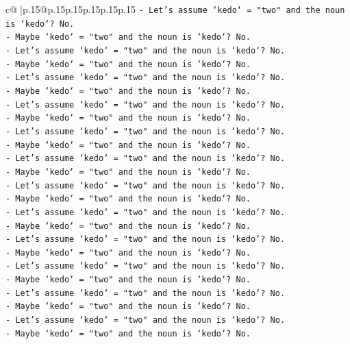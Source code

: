 \documentclass{article}
\begin{document}
{\begin{supertabular}{c@{$\;$}|p{.15\linewidth}@{}p{.15\linewidth}p{.15\linewidth}p{.15\linewidth}p{.15\linewidth}p{.15\linewidth}}
{{{\texttt{{-} Let's assume `kedo` = "two" and the noun is `kedo`? No.} \\
\texttt{{-} Maybe `kedo` = "two" and the noun is `kedo`? No.} \\
\texttt{{-} Let's assume `kedo` = "two" and the noun is `kedo`? No.} \\
\texttt{{-} Maybe `kedo` = "two" and the noun is `kedo`? No.} \\
\texttt{{-} Let's assume `kedo` = "two" and the noun is `kedo`? No.} \\
\texttt{{-} Maybe `kedo` = "two" and the noun is `kedo`? No.} \\
\texttt{{-} Let's assume `kedo` = "two" and the noun is `kedo`? No.} \\
\texttt{{-} Maybe `kedo` = "two" and the noun is `kedo`? No.} \\
\texttt{{-} Let's assume `kedo` = "two" and the noun is `kedo`? No.} \\
\texttt{{-} Maybe `kedo` = "two" and the noun is `kedo`? No.} \\
\texttt{{-} Let's assume `kedo` = "two" and the noun is `kedo`? No.} \\
\texttt{{-} Maybe `kedo` = "two" and the noun is `kedo`? No.} \\
\texttt{{-} Let's assume `kedo` = "two" and the noun is `kedo`? No.} \\
\texttt{{-} Maybe `kedo` = "two" and the noun is `kedo`? No.} \\
\texttt{{-} Let's assume `kedo` = "two" and the noun is `kedo`? No.} \\
\texttt{{-} Maybe `kedo` = "two" and the noun is `kedo`? No.} \\
\texttt{{-} Let's assume `kedo` = "two" and the noun is `kedo`? No.} \\
\texttt{{-} Maybe `kedo` = "two" and the noun is `kedo`? No.} \\
\texttt{{-} Let's assume `kedo` = "two" and the noun is `kedo`? No.} \\
\texttt{{-} Maybe `kedo` = "two" and the noun is `kedo`? No.} \\
\texttt{{-} Let's assume `kedo` = "two" and the noun is `kedo`? No.} \\
\texttt{{-} Maybe `kedo` = "two" and the noun is `kedo`? No.} \\
\texttt{{-} Let's assume `kedo` = "two" and the noun is `kedo`? No.} \\
\texttt{{-} Maybe `kedo` = "two" and the noun is `kedo`? No.} \\
}}}
\end{supertabular}}
\end{document}

